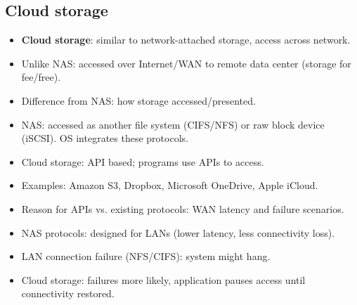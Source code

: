 \subsection{Cloud storage}
\begin{itemize}
    \item \textbf{Cloud storage}: similar to network-attached storage, access across network.
    \item Unlike NAS: accessed over Internet/WAN to remote data center (storage for fee/free).
    \item Difference from NAS: how storage accessed/presented.
    \item NAS: accessed as another file system (CIFS/NFS) or raw block device (iSCSI). OS integrates these protocols.
    \item Cloud storage: API based; programs use APIs to access.
    \item Examples: Amazon S3, Dropbox, Microsoft OneDrive, Apple iCloud.
    \item Reason for APIs vs. existing protocols: WAN latency and failure scenarios.
    \item NAS protocols: designed for LANs (lower latency, less connectivity loss).
    \item LAN connection failure (NFS/CIFS): system might hang.
    \item Cloud storage: failures more likely, application pauses access until connectivity restored.
\end{itemize}

